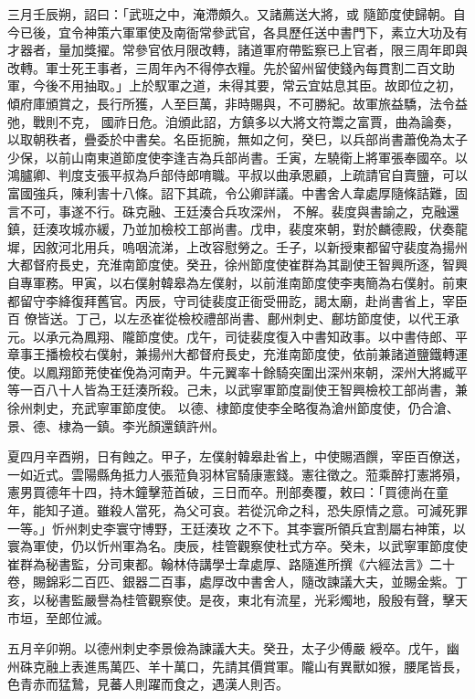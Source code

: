 \begin{pinyinscope}
 三月壬辰朔，詔曰：「武班之中，淹滯頗久。又諸薦送大將，或
 隨節度使歸朝。自今已後，宜令神策六軍軍使及南衙常參武官，各具歷任送中書門下，素立大功及有才器者，量加獎擢。常參官依月限改轉，諸道軍府帶監察已上官者，限三周年即與改轉。軍士死王事者，三周年內不得停衣糧。先於留州留使錢內每貫割二百文助軍，今後不用抽取。」上於馭軍之道，未得其要，常云宜姑息其臣。故即位之初，傾府庫頒賞之，長行所獲，人至巨萬，非時賜與，不可勝紀。故軍旅益驕，法令益弛，戰則不克，
 國祚日危。洎頒此詔，方鎮多以大將文符鬻之富賈，曲為論奏，以取朝秩者，疊委於中書矣。名臣扼腕，無如之何，癸巳，以兵部尚書蕭俛為太子少保，以前山南東道節度使李逢吉為兵部尚書。壬寅，左驍衛上將軍張奉國卒。以鴻臚卿、判度支張平叔為戶部侍郎唷職。平叔以曲承恩顧，上疏請官自賣鹽，可以富國強兵，陳利害十八條。詔下其疏，令公卿詳議。中書舍人韋處厚隨條詰難，固言不可，事遂不行。硃克融、王廷湊合兵攻深州，
 不解。裴度與書諭之，克融還鎮，廷湊攻城亦緩，乃並加檢校工部尚書。戊申，裴度來朝，對於麟德殿，伏奏龍墀，因敘河北用兵，嗚咽流涕，上改容慰勞之。壬子，以新授東都留守裴度為揚州大都督府長史，充淮南節度使。癸丑，徐州節度使崔群為其副使王智興所逐，智興自專軍務。甲寅，以右僕射韓皋為左僕射，以前淮南節度使李夷簡為右僕射。前東都留守李絳復拜舊官。丙辰，守司徒裴度正衙受冊訖，謁太廟，赴尚書省上，宰臣百
 僚皆送。丁己，以左丞崔從檢校禮部尚書、鄜州刺史、鄜坊節度使，以代王承元。以承元為鳳翔、隴節度使。戊午，司徒裴度復入中書知政事。以中書侍郎、平章事王播檢校右僕射，兼揚州大都督府長史，充淮南節度使，依前兼諸道鹽鐵轉運使。以鳳翔節茺使崔俛為河南尹。牛元翼率十餘騎突圍出深州來朝，深州大將臧平等一百八十人皆為王廷湊所殺。己未，以武寧軍節度副使王智興檢校工部尚書，兼徐州刺史，充武寧軍節度使。
 以德、棣節度使李全略復為滄州節度使，仍合滄、景、德、棣為一鎮。李光顏還鎮許州。



 夏四月辛酉朔，日有蝕之。甲子，左僕射韓皋赴省上，中使賜酒饌，宰臣百僚送，一如近式。雲陽縣角抵力人張蒞負羽林官騎康憲錢。憲往徵之。蒞乘醉打憲將殞，憲男買德年十四，持木鐘擊蒞首破，三日而卒。刑部奏覆，敕曰：「買德尚在童年，能知子道。雖殺人當死，為父可哀。若從沉命之科，恐失原情之意。可減死罪一等。」忻州刺史李寰守博野，王廷湊玫
 之不下。其李寰所領兵宜割屬右神策，以寰為軍使，仍以忻州軍為名。庚辰，桂管觀察使杜式方卒。癸未，以武寧軍節度使崔群為秘書監，分司東都。翰林侍講學士韋處厚、路隨進所撰《六經法言》二十卷，賜錦彩二百匹、銀器二百事，處厚改中書舍人，隨改諫議大夫，並賜金紫。丁亥，以秘書監嚴譽為桂管觀察使。是夜，東北有流星，光彩燭地，殷殷有聲，擊天市垣，至郎位滅。



 五月辛卯朔。以德州刺史李景儉為諫議大夫。癸丑，太子少傅嚴
 綬卒。戊午，幽州硃克融上表進馬萬匹、羊十萬口，先請其價賞軍。隴山有異獸如猴，腰尾皆長，色青赤而猛鷙，見蕃人則躍而食之，遇漢人則否。




\end{pinyinscope}

